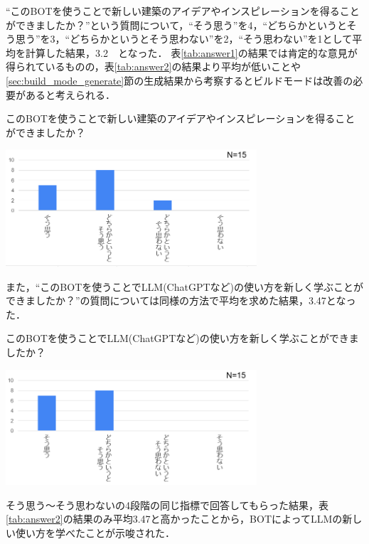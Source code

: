 ``このBOTを使うことで新しい建築のアイデアやインスピレーションを得ることができましたか？''という質問について，``そう思う''を4，``どちらかというとそう思う''を3，``どちらかというとそう思わない''を2，``そう思わない''を1として平均を計算した結果，3.2　となった．
表\ref{tab:answer1}の結果では肯定的な意見が得られているものの，表\ref{tab:answer2}の結果より平均が低いことや\ref{sec:build_mode_generate}節の生成結果から考察するとビルドモードは改善の必要があると考えられる．
\begin{table}[H]
    \centering
    \caption{このBOTを使うことで新しい建築のアイデアやインスピレーションを得ることができましたか？}
    \label{tab:answer1}
    \includegraphics[width=0.7\textwidth]{fig/tab2.png}
\end{table}

また，``このBOTを使うことでLLM(ChatGPTなど)の使い方を新しく学ぶことができましたか？''の質問については同様の方法で平均を求めた結果，3.47となった．

\begin{table}[H]
    \centering
    \caption{このBOTを使うことでLLM(ChatGPTなど)の使い方を新しく学ぶことができましたか？}
    \label{tab:answer2}
    \includegraphics[width=0.7\textwidth]{fig/tab3.png}
\end{table}

そう思う～そう思わないの4段階の同じ指標で回答してもらった結果，表\ref{tab:answer2}の結果のみ平均3.47と高かったことから，BOTによってLLMの新しい使い方を学べたことが示唆された．





